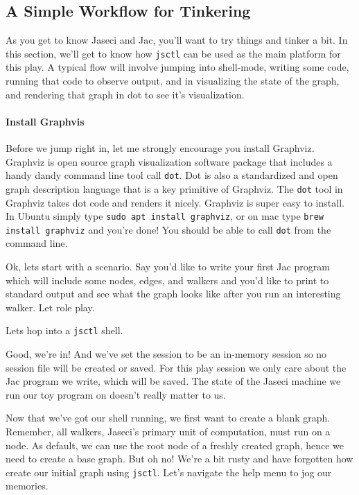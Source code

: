 \subsection{A Simple Workflow for Tinkering}

As you get to know Jaseci and Jac, you'll want to try things and tinker a bit. In this section, we'll get to know how \texttt{jsctl} can be used as the main platform for this play. A typical flow will involve jumping into shell-mode, writing some code, running that code to observe output, and in visualizing the state of the graph, and rendering that graph in dot to see it's visualization.
\paragraph{Install Graphvis}
Before we jump right in, let me strongly encourage you install Graphviz. Graphviz is open source graph visualization software package that includes a handy dandy command line tool call \texttt{dot}. Dot is also a standardized and open graph description language that is a key primitive of Graphviz. The \texttt{dot} tool in Graphviz takes dot code and renders it nicely. Graphviz is super easy to install. In Ubuntu simply type \texttt{sudo apt install graphviz}, or on mac type \texttt{brew install graphviz} and you're done! You should be able to call \texttt{dot} from the command line.
\par
Ok, lets start with a scenario. Say you'd like to write your first Jac program which will include some nodes, edges, and walkers and you'd like to print to standard output and see what the graph looks like after you run an interesting walker. Let role play.
\par
Lets hop into a \texttt{jsctl} shell.
\par
{}
\par
Good, we're in! And we've set the session to be an in-memory session so no session file will be created or saved. For this play session we only care about the Jac program we write, which will be saved. The state of the Jaseci machine we run our toy program on doesn't really matter to us.
\par
Now that we've got our shell running, we first want to create a blank graph. Remember, all walkers, Jaseci's primary unit of computation, must run on a node. As default, we can use the root node of a freshly created graph, hence we need to create a base graph. But oh no! We're a bit rusty and have forgotten how create our initial graph using \texttt{jsctl}. Let's navigate the help menu to jog our memories.
